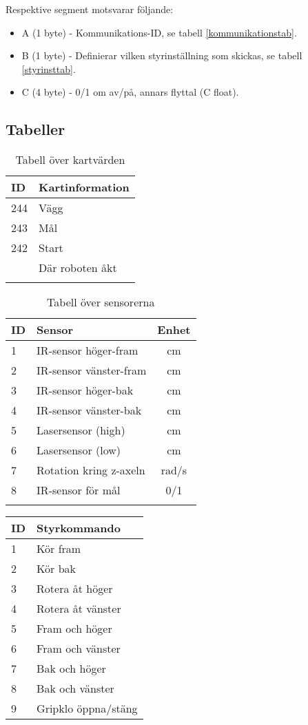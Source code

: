 \documentclass[11pt]{article}
\begin{document}
\begin{flushleft}
Respektive segment motsvarar följande: 
\begin{itemize}
	\item A (1 byte) - Kommunikations-ID, se tabell \ref{kommunikationstab}.
	\item B (1 byte) - Definierar vilken styrinställning som skickas, se tabell \ref{styrinsttab}.
	\item C (4 byte) - 0/1 om av/på, annars flyttal (C float).
\end{itemize}

\subsection{Tabeller}

\begin{longtable}[l]{| l | l |} \hline
\textbf{ID} & \textbf{Kartinformation} \\ \hline 
244 & Vägg \\ \hline
243 & Mål \\ \hline
242 & Start \\ \hline
[0,225] & Där roboten åkt \\ \hline

\caption{Tabell över kartvärden }\label{maptab}
\end{longtable}

\begin{longtable}[l]{| l | l | c |} \hline
\textbf{ID} & \textbf{Sensor} & \textbf{Enhet} \\ \hline 
1 & IR-sensor höger-fram & cm \\ \hline
2 & IR-sensor vänster-fram  & cm \\ \hline
3 & IR-sensor höger-bak  & cm  \\ \hline
4 & IR-sensor vänster-bak  &  cm \\ \hline
5 & Lasersensor (high) & cm  \\ \hline
6 & Lasersensor (low) & cm  \\ \hline
7 & Rotation kring z-axeln & rad/s \\ \hline
8 & IR-sensor för mål & 0/1 \\ \hline
\caption{Tabell över sensorerna}\label{sensortab}
\end{longtable}

\begin{longtable}[l]{| l | l |} \hline
\textbf{ID} & \textbf{Styrkommando} \\ \hline 
1 & Kör fram \\ \hline
2 & Kör bak \\ \hline
3 & Rotera åt höger \\ \hline
4 & Rotera åt vänster \\ \hline
5 & Fram och höger \\ \hline
6 & Fram och vänster \\ \hline
7 & Bak och höger \\ \hline
8 & Bak och vänster \\ \hline
9 & Gripklo öppna/stäng \\ \hline


\end{longtable}
\end{flushleft}
\end{document}
